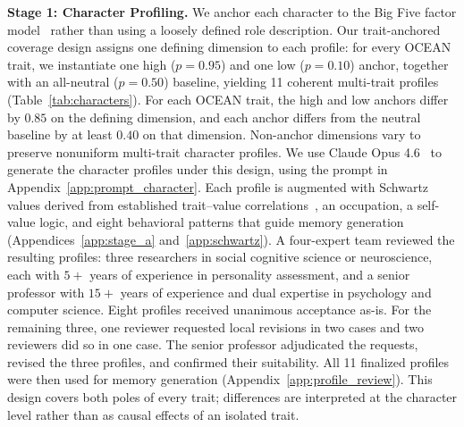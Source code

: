 \documentclass[11pt]{article}
\begin{document}
\textbf{Stage 1: Character Profiling.} We anchor each character to the Big Five factor model~\citep{mccrae1992introduction} rather than using a loosely defined role description. Our trait-anchored coverage design assigns one defining dimension to each profile: for every OCEAN trait, we instantiate one high ($p=0.95$) and one low ($p=0.10$) anchor, together with an all-neutral ($p=0.50$) baseline, yielding 11 coherent multi-trait profiles (Table~\ref{tab:characters}). For each OCEAN trait, the high and low anchors differ by $0.85$ on the defining dimension, and each anchor differs from the neutral baseline by at least $0.40$ on that dimension. Non-anchor dimensions vary to preserve nonuniform multi-trait character profiles. We use Claude Opus 4.6~\cite{anthropic2026opus46} to generate the character profiles under this design, using the prompt in Appendix~\ref{app:prompt_character}. Each profile is augmented with Schwartz values derived from established trait--value correlations~\cite{schwartz1992universals,roccas2002bigfive}, an occupation, a self-value logic, and eight behavioral patterns that guide memory generation (Appendices~\ref{app:stage_a} and~\ref{app:schwartz}). A four-expert team reviewed the resulting profiles: three researchers in social cognitive science or neuroscience, each with $5{+}$ years of experience in personality assessment, and a senior professor with $15{+}$ years of experience and dual expertise in psychology and computer science. Eight profiles received unanimous acceptance as-is. For the remaining three, one reviewer requested local revisions in two cases and two reviewers did so in one case. The senior professor adjudicated the requests, revised the three profiles, and confirmed their suitability. All 11 finalized profiles were then used for memory generation (Appendix~\ref{app:profile_review}). This design covers both poles of every trait; differences are interpreted at the character level rather than as causal effects of an isolated trait.
\end{document}
